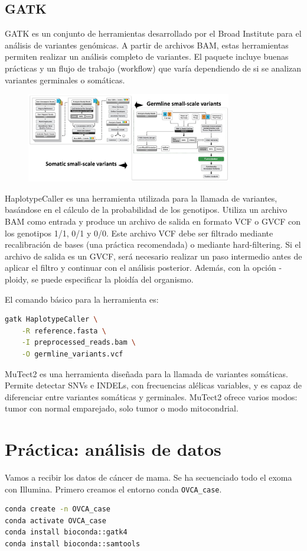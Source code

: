 \subsection{GATK}
GATK es un conjunto de herramientas desarrollado por el Broad Institute para el análisis de variantes genómicas. A partir de archivos BAM, estas herramientas permiten realizar un análisis completo de variantes. El paquete incluye buenas prácticas y un flujo de trabajo (workflow) que varía dependiendo de si se analizan variantes germinales o somáticas.

\begin{figure}[h!]
\centering
\includegraphics[width = 0.8\textwidth]{figs/gatk-pipelines.png}
\end{figure}

HaplotypeCaller es una herramienta utilizada para la llamada de variantes, basándose en el cálculo de la probabilidad de los genotipos. Utiliza un archivo BAM como entrada y produce un archivo de salida en formato VCF o GVCF con los genotipos 1/1, 0/1 y 0/0. Este archivo VCF debe ser filtrado mediante recalibración de bases (una práctica recomendada) o mediante hard-filtering. Si el archivo de salida es un GVCF, será necesario realizar un paso intermedio antes de aplicar el filtro y continuar con el análisis posterior. Además, con la opción -ploidy, se puede especificar la ploidía del organismo.

El comando básico para la herramienta es:
\begin{lstlisting}[language = bash]
gatk HaplotypeCaller \
	-R reference.fasta \
	-I preprocessed_reads.bam \
	-O germline_variants.vcf
\end{lstlisting}

MuTect2 es una herramienta diseñada para la llamada de variantes somáticas. Permite detectar SNVs e INDELs, con frecuencias alélicas variables, y es capaz de diferenciar entre variantes somáticas y germinales. MuTect2 ofrece varios modos: tumor con normal emparejado, solo tumor o modo mitocondrial.

\section{Práctica: análisis de datos}
Vamos a recibir los datos de cáncer de mama. Se ha secuenciado todo el exoma con Illumina. Primero creamos el entorno conda \texttt{OVCA\_case}. 
\begin{lstlisting}[language=bash]
conda create -n OVCA_case
conda activate OVCA_case
conda install bioconda::gatk4
conda install bioconda::samtools
\end{lstlisting}

